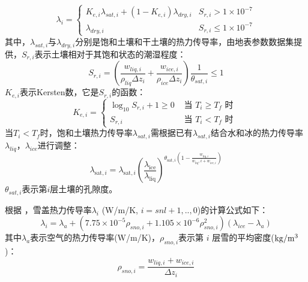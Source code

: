 \begin{equation}
\lambda_{i}=\left\{\begin{array}{ll}K_{e, i} \lambda_{sat, i}+\left(1-K_{e, i}\right) \lambda_{d r y, i} & S_{r, i}>1 \times 10^{-7} \\ \lambda_{d r y, i} & S_{r, i} \leq 1 \times10^{-7}\end{array}\right.
\end{equation}
其中，$\lambda_{sat,i}$与$\lambda_{dry,i}$分别是饱和土壤和干土壤的热力传导率，由地表参数数据集提供，$S_{r,i}$表示土壤相对于其饱和状态的潮湿程度：
\begin{equation}
S_{r, i}=\left(\frac{w_{liq, i}}{\rho_{liq} \Delta z_{i}}+\frac{w_{ice, i}}{\rho_{ice} \Delta z_{i}}\right) \frac{1}{\theta_{sat, i}} \leq 1
\end{equation}
$K_{e,i}$表示Kersten数，它是$S_{r,i}$的函数：
\begin{equation}
K_{e, i}=\left\{\begin{array}{ll}\log _{10} S_{r, i}+1 \geq 0 & \text{ 当 } T_{i} \geq T_{f} \text{ 时 } \\ S_{r, i} & \text{ 当 } T_{i}<T_{f} \text{ 时 }\end{array}\right.
\end{equation}
当$T_i<T_f$时，饱和土壤热力传导率$\lambda_{sat,i}$需根据已有$\lambda_{sat,i}$结合水和冰的热力传导率$\lambda_{liq}$，$\lambda_{ice}$进行调整：
\begin{equation}
\lambda_{\text {sat}, i}=\lambda_{\text {sat}, i}\left(\frac{\lambda_{\text {ice}}}{\lambda_{\text {liq}}}\right)^{\theta_{\text {sat}, i}\left(1-\frac{w_{liq, i}}{w_{liq}, i+w_{ice, i}}\right)}
\end{equation}
$\theta_{sat,i}$表示第$ i $层土壤的孔隙度。


根据 \citet{jordan1991one}，雪盖热力传导率$\lambda_i$ (W/m/K, $i=snl+1,..,0$)的计算公式如下：
\begin{equation}
\lambda_{i}=\lambda_{a}+\left(7.75 \times 10^{-5} \rho_{sno, i}+1.105 \times 10^{-6} \rho_{sno, i}^{2}\right)\left(\lambda_{ice}-\lambda_{a}\right)
\end{equation}
其中$\lambda_a$表示空气的热力传导率(W/m/K)，$\rho_{sno,i}$表示第 $i$ 层雪的平均密度($\rm kg/m^3$)：
\begin{equation}
\rho_{sno, i}=\frac{w_{liq, i}+w_{ice, i}}{\Delta z_{i}}
\end{equation}



